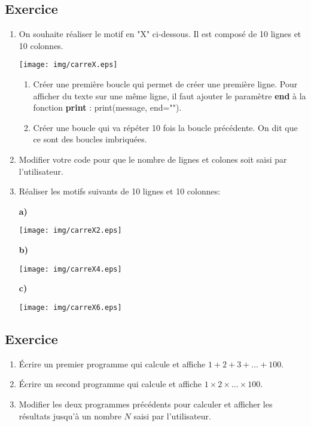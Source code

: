 \documentclass[11pt,a4paper]{article}
\newcounter{numexo}
\begin{document}
\subsection*{\Large Exercice \thenumexo }
\begin{enumerate}
\item On souhaite réaliser le motif en "X" ci-dessous. Il est composé de 10 lignes et 10 colonnes.
\begin{center}
\texttt{[image: img/carreX.eps]}
\end{center}
\begin{enumerate}
\item Créer une première boucle qui permet de créer une première ligne. Pour afficher du texte sur une même ligne, il faut ajouter le paramètre \textbf{end} à la fonction \textbf{print} : print(message, end="").
\item Créer une boucle qui va répéter 10 fois la boucle précédente. On dit que ce sont des boucles imbriquées.
\end{enumerate}
\item Modifier votre code pour que le nombre de lignes et colones soit saisi par l'utilisateur.
\item Réaliser les motifs suivants de 10 lignes et 10 colonnes:

\begin{minipage}{6cm}
\textbf{a)}
\begin{center}
\texttt{[image: img/carreX2.eps]}
\end{center}
\end{minipage}
\begin{minipage}{6cm}
\textbf{b)}
\begin{center}
\texttt{[image: img/carreX4.eps]}
\end{center}
\end{minipage}
\begin{minipage}{6cm}
\textbf{c)}
\begin{center}
\texttt{[image: img/carreX6.eps]}
\end{center}
\end{minipage}
\end{enumerate}

\addtocounter{numexo}{1}
\subsection*{\Large Exercice \thenumexo }
\begin{enumerate}
\item Écrire un premier programme qui calcule et affiche $1 + 2 + 3 + \ldots + 100$.
\item Écrire un second programme qui calcule et affiche $1 \times 2 \times \ldots \times 100$.
\item Modifier les deux programmes précédents pour calculer et afficher les résultats jusqu'à un nombre $N$ saisi par l'utilisateur.
\end{enumerate}
\end{document}
